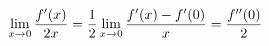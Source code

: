 \documentclass[preview]{standalone}
\begin{document}
\begin{align*}
\special{dvisvgm:raw <g id='unique000'>}\lim_{x\to 0}\dfrac{f'(x)}{2x}=\dfrac{1}{2}\lim_{x\to 0}\dfrac{f'(x)-f'(0)}{x}=\dfrac{f''(0)}{2}\special{dvisvgm:raw </g>}
\end{align*}
\end{document}
